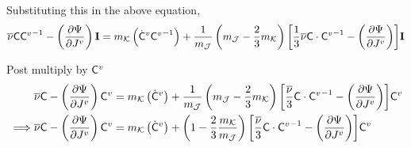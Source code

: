 \documentclass{beamer}
\def\myPsi{{\mathrm{\Psi}}}
\def\myC{{\bf\mathsf{C}}}
\newcommand\lrB[1]{{\left[#1 \right]}}
\begin{document}
    \begin{frame}
        \begin{block}{Substituting this in the above equation,}
            \footnotesize
            \begin{align*}
                \overline{\nu}\myC{\myC^v}^{-1} -
                \left({\del{\myPsi}{J^v}}\right) {\bf I} = m_\mathcal{K}
                \left(
                    \dot{\myC}^v{\myC^v}^{-1}
                \right)
                +
                \frac{1}{m_\mathcal{J}}
                \lr{m_\mathcal{J}
                - \frac{2}{3}m_\mathcal{K}
                }\lrB{
                    \frac{1}{3}\overline{\nu}{\myC}\cdot{\myC^v}^{-1}
                -
                \left({\del{\myPsi}{J^v}}\right)
                }{\bf I}
            \end{align*}
        \end{block}
        \begin{block}{Post multiply by $\myC^v$}
            \footnotesize
            \begin{align*}
                & \overline{\nu}\myC -
                \left({\del{\myPsi}{J^v}}\right) {\myC}^v = m_\mathcal{K}
                \left(
                    \dot{\myC}^v
                \right)
                +
                \frac{1}{m_\mathcal{J}}
                \lr{m_\mathcal{J}
                - \frac{2}{3}m_\mathcal{K}
                }\lrB{
                    \frac{\overline{\nu}}{3}{\myC}\cdot{\myC^v}^{-1}
                -
                \left({\del{\myPsi}{J^v}}\right)
                }{\myC}^v\\
                \implies &
                \overline{\nu}\myC -
                \left({\del{\myPsi}{J^v}}\right) {\myC}^v
                 = m_\mathcal{K}
                \left(
                    \dot{\myC}^v
                \right)
                +
                \lr{1
                - \frac{2}{3}\frac{m_\mathcal{K}}{m_\mathcal{J}}
                }\lrB{
                    \frac{\overline{\nu}}{3}{\myC}\cdot{\myC^v}^{-1}
                -
                \left({\del{\myPsi}{J^v}}\right)
                }{\myC}^v
            \end{align*}
        \end{block}
    \end{frame}
\end{document}

